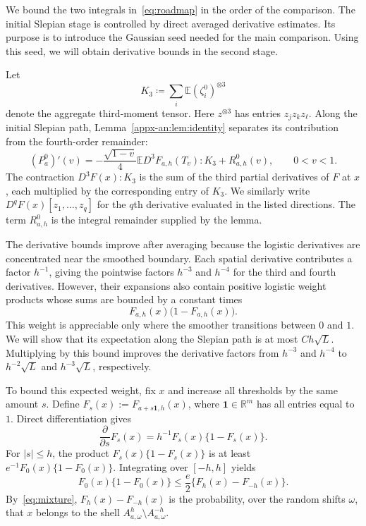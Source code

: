 \documentclass[11pt,letterpaper]{article}
\theoremstyle{remark}
\newcommand{\E}{\mathbb E}
\newcommand{\R}{\mathbb R}
\begin{document}
{
We bound the two integrals in~\eqref{eq:roadmap} in the order of the
comparison. {The initial Slepian stage is controlled by direct averaged derivative estimates.} Its purpose is to introduce
the Gaussian seed needed for the main comparison. {Using this seed, we will obtain derivative bounds in the second stage.}

Let
\[
 K_3\coloneqq\sum_i\E(\zeta_i^0)^{\otimes3}
\]
denote the aggregate third-moment tensor.
{
Here \(z^{\otimes3}\) has entries \(z_jz_kz_\ell\).
}
Along the initial Slepian path,
Lemma~\ref{appx-an:lem:identity} separates its contribution from the
fourth-order remainder:
\[
 (P_a^0)'(v)
 =-\frac{\sqrt{1-v}}4\E D^3F_{a,h}(T_v):K_3+R^0_{a,h}(v),
 \qquad 0<v<1.
\]
{
The contraction \(D^3F(x):K_3\) is the sum of the third partial
derivatives of \(F\) at \(x\), each multiplied by the corresponding
entry of \(K_3\). We similarly write
\(D^qF(x)[z_1,\ldots,z_q]\) for the \(q\)th derivative evaluated in
the listed directions. The term \(R^0_{a,h}\) is the integral
remainder supplied by the lemma.
}

{
The derivative bounds improve after averaging because the logistic
 derivatives are concentrated near the smoothed boundary. Each spatial
 derivative contributes a factor \(h^{-1}\), giving the pointwise factors
 \(h^{-3}\) and \(h^{-4}\) for the third and fourth derivatives.
 However, their expansions also contain positive logistic weight products
 whose sums are bounded by a constant times
\[
 F_{a,h}(x)\bigl(1-F_{a,h}(x)\bigr).
\]
This weight is appreciable only where the smoother transitions between
\(0\) and \(1\). We will show that its expectation along the Slepian
path is at most \(Ch\sqrt L\). Multiplying by this bound improves the
 derivative factors from \(h^{-3}\) and \(h^{-4}\) to
\(h^{-2}\sqrt L\) and \(h^{-3}\sqrt L\), respectively.

{
To bound this expected weight, fix \(x\) and increase all thresholds
by the same amount \(s\). Define
\(F_s(x):=F_{a+s\mathbf1,h}(x)\), where \(\mathbf1\in\R^m\)
has all entries equal to \(1\). Direct differentiation gives
\[
 \frac{\partial}{\partial s}F_s(x)
 =h^{-1}F_s(x)\{1-F_s(x)\}.
\]
For \(|s|\le h\), the product \(F_s(x)\{1-F_s(x)\}\) is at least
\(e^{-1}F_0(x)\{1-F_0(x)\}\). Integrating over \([-h,h]\) yields
\[
 F_0(x)\{1-F_0(x)\}
 \le \frac e2\{F_h(x)-F_{-h}(x)\}.
\]
By~\eqref{eq:mixture}, \(F_h(x)-F_{-h}(x)\) is the probability,
over the random shifts \(\omega\), that \(x\) belongs to the shell
\(A_{a,\omega}^{h}\setminus A_{a,\omega}^{-h}\).

}}}
\end{document}
